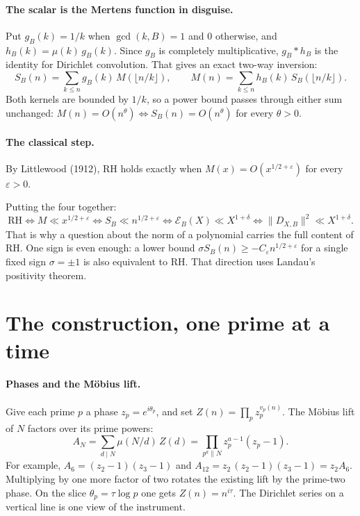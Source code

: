 \documentclass[11pt]{article}
\newcommand{\E}{\mathscr{E}}
\begin{document}
\paragraph{The scalar is the Mertens function in disguise.} Put $g_B(k) = 1/k$ when $\gcd(k,B)=1$ and $0$ otherwise, and $h_B(k) = \mu(k)\,g_B(k)$. Since $g_B$ is completely multiplicative, $g_B * h_B$ is the identity for Dirichlet convolution. That gives an exact two-way inversion:
\[
S_B(n) = \sum_{k \le n} g_B(k)\, M(\lfloor n/k \rfloor), \qquad M(n) = \sum_{k \le n} h_B(k)\, S_B(\lfloor n/k \rfloor).
\]
Both kernels are bounded by $1/k$, so a power bound passes through either sum unchanged: $M(n) = O(n^\theta) \iff S_B(n) = O(n^\theta)$ for every $\theta > 0$.

\paragraph{The classical step.} By Littlewood (1912), RH holds exactly when $M(x) = O(x^{1/2+\varepsilon})$ for every $\varepsilon > 0$.

\medskip
\noindent Putting the four together:
\[
\text{RH} \iff M \ll x^{1/2+\varepsilon} \iff S_B \ll n^{1/2+\varepsilon} \iff \E_B(X) \ll X^{1+\delta} \iff \|D_{X,B}\|^2 \ll X^{1+\delta}.
\]
That is why a question about the norm of a polynomial carries the full content of RH. One sign is even enough: a lower bound $\sigma S_B(n) \ge -C_\varepsilon n^{1/2+\varepsilon}$ for a single fixed sign $\sigma = \pm 1$ is also equivalent to RH. That direction uses Landau's positivity theorem.

\section{The construction, one prime at a time}

\paragraph{Phases and the M\"obius lift.} Give each prime $p$ a phase $z_p = e^{i\theta_p}$, and set $Z(n) = \prod_p z_p^{v_p(n)}$. The M\"obius lift of $N$ factors over its prime powers:
\[
A_N = \sum_{d \mid N} \mu(N/d)\, Z(d) = \prod_{p^a \parallel N} z_p^{a-1}(z_p - 1).
\]
For example, $A_6 = (z_2-1)(z_3-1)$ and $A_{12} = z_2\,(z_2-1)(z_3-1) = z_2 A_6$. Multiplying by one more factor of two rotates the existing lift by the prime-two phase. On the slice $\theta_p = \tau\log p$ one gets $Z(n) = n^{i\tau}$. The Dirichlet series on a vertical line is one view of the instrument.
\end{document}
